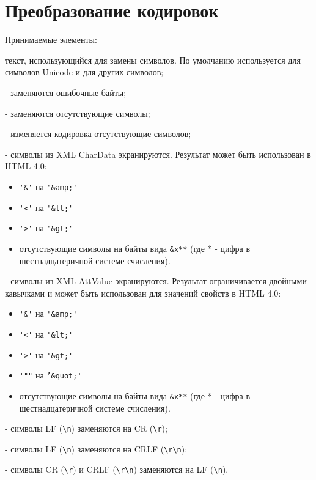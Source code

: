 \hypertarget{appencode}{}
\chapter{Преобразование кодировок}

\begin{keylist}{Принимаемые элементы:}
  
   текст, использующийся для замены символов. По умолчанию используется  для символов Unicode и  для других символов;
  
   - заменяются ошибочные байты;
  
   - заменяются отсутствующие символы;
  
   - изменяется кодировка отсутствующие символов;
  
   - символы из XML CharData экранируются. Результат может быть использован в HTML 4.0: 
    \begin{itemize}
      \item \verb!'&'! на \verb!'&amp;'! 
      \item \verb!'<'! на \verb!'&lt;'!
      \item \verb!'>'! на \verb!'&gt;'! 
      \item отсутствующие символы на байты вида \verb!&x**! (где * - цифра в шестнадцатеричной системе счисления).
    \end{itemize}
  
   - символы из XML AttValue экранируются. Результат ограничивается двойными кавычками и может быть использован для значений свойств в HTML 4.0: 
    \begin{itemize}
      \item \verb!'&'! на \verb!'&amp;'! 
      \item \verb!'<'! на \verb!'&lt;'!
      \item \verb!'>'! на \verb!'&gt;'! 
      \item \verb!'""! на \verb!’&quot;'!
      \item отсутствующие символы на байты вида \verb!&x**! (где * - цифра в шестнадцатеричной системе счисления).
    \end{itemize}
  
   - символы LF (\verb!\n!) заменяются на CR (\verb!\r!);
  
   - символы LF (\verb!\n!) заменяются на CRLF (\verb!\r\n!);
  
   - символы CR (\verb!\r!) и CRLF (\verb!\r\n!) заменяются на LF (\verb!\n!).  
\end{keylist}